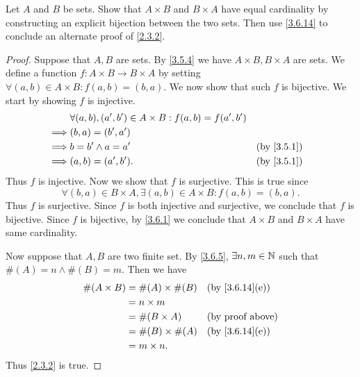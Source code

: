 \begin{ex}\label{ex:3.6.5}
  Let \(A\) and \(B\) be sets.
  Show that \(A \times B\) and \(B \times A\) have equal cardinality by constructing an explicit bijection between the two sets.
  Then use \cref{3.6.14} to conclude an alternate proof of \cref{2.3.2}.
\end{ex}

\begin{proof}
  Suppose that \(A, B\) are sets.
  By \cref{3.5.4} we have \(A \times B, B \times A\) are sets.
  We define a function \(f : A \times B \to B \times A\) by setting \(\forall (a, b) \in A \times B : f(a, b) = (b, a)\).
  We now show that such \(f\) is bijective.
  We start by showing \(f\) is injective.
  \begin{align*}
             & \forall (a, b), (a', b') \in A \times B : f(a, b) = f(a', b')                 \\
    \implies & (b, a) = (b', a')                                                             \\
    \implies & b = b' \land a = a'                                           &  & \by{3.5.1} \\
    \implies & (a, b) = (a', b').                                            &  & \by{3.5.1}
  \end{align*}
  Thus \(f\) is injective.
  Now we show that \(f\) is surjective.
  This is true since
  \[
    \forall (b, a) \in B \times A, \exists (a, b) \in A \times B : f(a, b) = (b, a).
  \]
  Thus \(f\) is surjective.
  Since \(f\) is both injective and surjective, we conclude that \(f\) is bijective.
  Since \(f\) is bijective, by \cref{3.6.1} we conclude that \(A \times B\) and \(B \times A\) have same cardinality.

  Now suppose that \(A, B\) are two finite set.
  By \cref{3.6.5}, \(\exists n, m \in \mathbb{N}\) such that \(\#(A) = n \land \#(B) = m\).
  Then we have
  \begin{align*}
    \#(A \times B) & = \#(A) \times \#(B) &  & \text{(by \cref{3.6.14}(e))} \\
                   & = n \times m                                           \\
                   & = \#(B \times A)     &  & \text{(by proof above)}      \\
                   & = \#(B) \times \#(A) &  & \text{(by \cref{3.6.14}(e))} \\
                   & = m \times n.
  \end{align*}
  Thus \cref{2.3.2} is true.
\end{proof}


